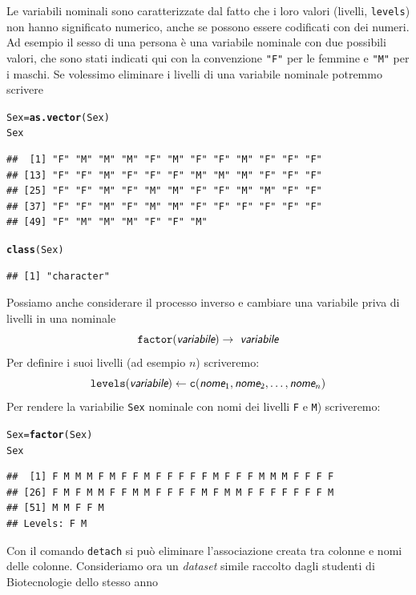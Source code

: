\documentclass[onecolumn,12pt]{book}\usepackage[]{graphicx}\usepackage[]{color}
\makeatletter
\newcommand{\hlstd}[1]{\textcolor[rgb]{0.345,0.345,0.345}{#1}}%
\newcommand{\hlkwb}[1]{\textcolor[rgb]{0.69,0.353,0.396}{#1}}%
\newcommand{\hlkwd}[1]{\textcolor[rgb]{0.737,0.353,0.396}{\textbf{#1}}}%
\newenvironment{kframe}{%
 \def\at@end@of@kframe{}%
 \ifinner\ifhmode%
  \def\at@end@of@kframe{\end{minipage}}%
  \begin{minipage}{\columnwidth}%
 \fi\fi%
 \def\FrameCommand##1{\hskip\@totalleftmargin \hskip-\fboxsep
 \colorbox{shadecolor}{##1}\hskip-\fboxsep
     \hskip-\linewidth \hskip-\@totalleftmargin \hskip\columnwidth}%
 \MakeFramed {\advance\hsize-\width
   \@totalleftmargin\z@ \linewidth\hsize
   \@setminipage}}%
 {\par\unskip\endMakeFramed%
 \at@end@of@kframe}
\newenvironment{knitrout}{}{} %
\newcommand{\varia}[1]{\textsl{\textsf{#1}}}
\makeatother
\begin{document}
Le variabili nominali sono caratterizzate dal fatto che i loro valori (livelli, \texttt{levels})  non hanno significato numerico, anche se possono essere codificati con dei numeri.   Ad esempio il sesso di una persona \`e una variabile nominale con due possibili valori, che sono stati  indicati qui con la convenzione  \texttt{"F"}  per le femmine e \texttt{"M"} per i maschi.  Se volessimo eliminare i livelli di una variabile nominale potremmo scrivere
\begin{knitrout}
\color{fgcolor}\begin{kframe}
\begin{alltt}
\hlstd{Sex}\hlkwb{=}\hlkwd{as.vector}\hlstd{(Sex)}
\hlstd{Sex}
\end{alltt}
\begin{verbatim}
##  [1] "F" "M" "M" "M" "F" "M" "F" "F" "M" "F" "F" "F"
## [13] "F" "F" "M" "F" "F" "F" "M" "M" "M" "F" "F" "F"
## [25] "F" "F" "M" "F" "M" "M" "F" "F" "M" "M" "F" "F"
## [37] "F" "F" "M" "F" "M" "M" "F" "F" "F" "F" "F" "F"
## [49] "F" "M" "M" "M" "F" "F" "M"
\end{verbatim}
\begin{alltt}
\hlkwd{class}\hlstd{(Sex)}
\end{alltt}
\begin{verbatim}
## [1] "character"
\end{verbatim}
\end{kframe}
\end{knitrout}
Possiamo anche considerare il processo inverso e cambiare una variabile priva di livelli in una nominale
$$\texttt{factor}(\varia{variabile})\rightarrow\varia{ variabile}$$
Per definire i suoi livelli (ad esempio $n$) scriveremo:
$$\texttt{levels}(\varia{variabile})\leftarrow\texttt{c}(\varia{nome}_1,\varia{nome}_2,\ldots,\varia{nome}_n)$$
Per rendere la variabilie \texttt{Sex} nominale con nomi dei livelli
\texttt{F} e \texttt{M})  scriveremo:
\begin{knitrout}
\color{fgcolor}\begin{kframe}
\begin{alltt}
\hlstd{Sex}\hlkwb{=}\hlkwd{factor}\hlstd{(Sex)}
\hlstd{Sex}
\end{alltt}
\begin{verbatim}
##  [1] F M M M F M F F M F F F F F M F F F M M M F F F F
## [26] F M F M M F F M M F F F F M F M M F F F F F F F M
## [51] M M F F M
## Levels: F M
\end{verbatim}
\end{kframe}
\end{knitrout}
Con il comando
\texttt{detach}   si pu\`o eliminare l'associazione creata tra colonne e nomi delle colonne.
Consideriamo ora un \emph{dataset} simile raccolto dagli studenti di Biotecnologie dello stesso anno
\end{document}
